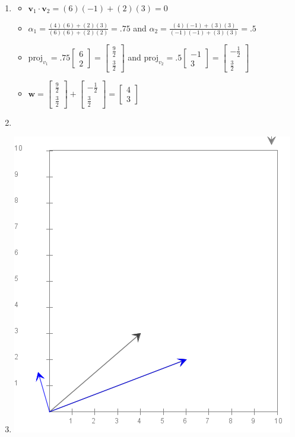 \documentclass{article}
\begin{document}
\begin{enumerate}
\item
	\begin{itemize}
		\item $\textbf{v}_1 \cdot \textbf{v}_2 = (6)(-1) + (2)(3) = 0$	
		\item $\alpha_1 = \frac{(4)(6) + (2)(3)}{(6)(6) + (2)(2)} = .75$ and $\alpha_2 = \frac{(4)(-1) + (3)(3)}{(-1)(-1) + (3)(3)} = .5$
		\item $\text{proj}_{v_1} = .75 \begin{bmatrix}6\\2\end{bmatrix} = \begin{bmatrix}\frac{9}{2}\\\frac{3}{2}\end{bmatrix}$ and $\text{proj}_{v_2} = .5 \begin{bmatrix}-1\\3\end{bmatrix} = \begin{bmatrix}-\frac{1}{2}\\\frac{3}{2}\end{bmatrix}$
		\item $\textbf{w} = \begin{bmatrix}\frac{9}{2}\\\frac{3}{2}\end{bmatrix} + \begin{bmatrix}-\frac{1}{2}\\\frac{3}{2}\end{bmatrix} = \begin{bmatrix}4\\3\end{bmatrix}$
	\end{itemize}

\item

\item 

\includegraphics[scale=0.5]{module7_exercise26}


\end{enumerate}
\end{document}
